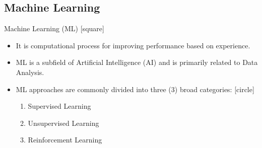 \subsection{Machine Learning}\label{subsec:machine-learning}

\begin{frame}{Machine Learning (ML)}
    [square]
    \begin{itemize}
        \item{It is computational process for improving performance based on experience.}
        \vspace{0.4cm}
        \item{ML is a subfield of Artificial Intelligence (AI) and is primarily related to Data Analysis.}
        \vspace{0.4cm}
        \item{ML approaches are commonly divided into three ($3$) broad categories:
        [circle]
        \begin{enumerate}
            \item Supervised Learning %
            \item Unsupervised Learning %
            \item Reinforcement Learning %
        \end{enumerate}}
    \end{itemize}
\end{frame}

